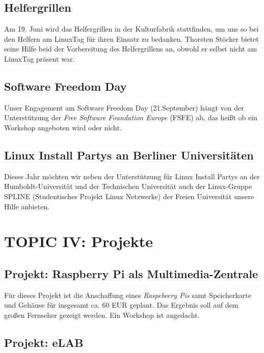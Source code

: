 \documentclass[11pt,a4paper,ngerman]{article}
\begin{document}
  \subsection{Helfergrillen}
  
Am 19. Juni wird das Helfergrillen in der Kulturfabrik stattfinden, um uns so 
bei den Helfern am LinuxTag für ihren Einsatz zu bedanken. Thorsten Stöcker 
bietet seine Hilfe beid der Vorbereitung des Helfergrillens an, obwohl er 
selbst nicht am LinuxTag präsent war.



  \subsection{Software Freedom Day}
  
Unser Engagement am Software Freedom Day (21.September) hängt von der 
Unterstützung der \emph{Free Software Foundation Europe} (FSFE) ab, das heißt 
ob ein Workshop angeboten wird oder nicht.


  \subsection{Linux Install Partys an Berliner Universitäten}

Dieses Jahr möchten wir neben der Unterstützung für Linux Install Partys an der 
Humboldt-Universität und der Technischen Universität auch der Linux-Gruppe 
SPLINE (Studentisches Projekt Linux Netzwerke) der Freien Universität unsere 
Hilfe anbieten.


\section{TOPIC IV: Projekte}


  \subsection{Projekt: Raspberry Pi als Multimedia-Zentrale}
  
Für dieses Projekt ist die Anschaffung eines \emph{Raspebeery Pis} samt 
Speicherkarte und Gehäuse für insgesamt ca. 60 EUR geplant. Das Ergebnis soll 
auf dem großen Fernseher gezeigt werden. Ein Workshop ist angedacht.


  \subsection{Projekt: eLAB}
  
\end{document}
